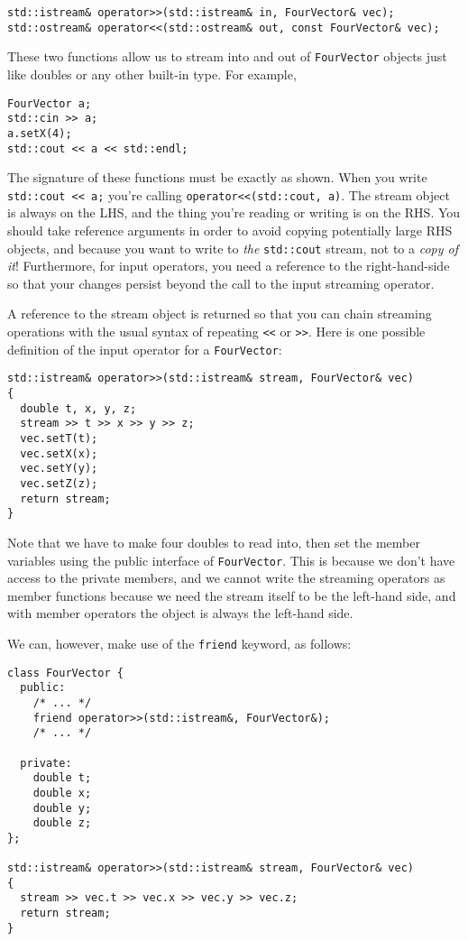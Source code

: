 \documentclass[a4paper]{scrartcl}
\begin{document}
\begin{verbatim}
std::istream& operator>>(std::istream& in, FourVector& vec);
std::ostream& operator<<(std::ostream& out, const FourVector& vec);
\end{verbatim}

These two functions allow us to stream into and out of \verb|FourVector| objects just like doubles or any other built-in type. For example,

\begin{verbatim}
FourVector a;
std::cin >> a;
a.setX(4);
std::cout << a << std::endl;
\end{verbatim}

The signature of these functions must be exactly as shown. When you write \newline \verb|std::cout << a;| you're calling \verb|operator<<(std::cout, a)|. The stream object is always on the LHS, and the thing you're reading or writing is on the RHS. You should take reference arguments in order to avoid copying potentially large RHS objects, and because you want to write to \emph{the} \verb|std::cout| stream, not to a \emph{copy of it}! Furthermore, for input operators, you need a reference to the right-hand-side so that your changes persist beyond the call to the input streaming operator.

A reference to the stream object is returned so that you can chain streaming operations with the usual syntax of repeating \verb|<<| or \verb|>>|. Here is one possible definition of the input operator for a \verb|FourVector|:

\begin{verbatim}
std::istream& operator>>(std::istream& stream, FourVector& vec)
{
  double t, x, y, z;
  stream >> t >> x >> y >> z;
  vec.setT(t);
  vec.setX(x);
  vec.setY(y);
  vec.setZ(z);
  return stream;
}
\end{verbatim}

Note that we have to make four doubles to read into, then set the member variables using the public interface of \verb|FourVector|. This is because we don't have access to the private members, and we cannot write the streaming operators as member functions because we need the stream itself to be the left-hand side, and with member operators the object is always the left-hand side.

We can, however, make use of the \verb|friend| keyword, as follows:

\begin{verbatim}
class FourVector {
  public:
    /* ... */
    friend operator>>(std::istream&, FourVector&);
    /* ... */

  private:
    double t;
    double x;
    double y;
    double z;
};

std::istream& operator>>(std::istream& stream, FourVector& vec)
{
  stream >> vec.t >> vec.x >> vec.y >> vec.z;
  return stream;
}
\end{verbatim}
\end{document}
